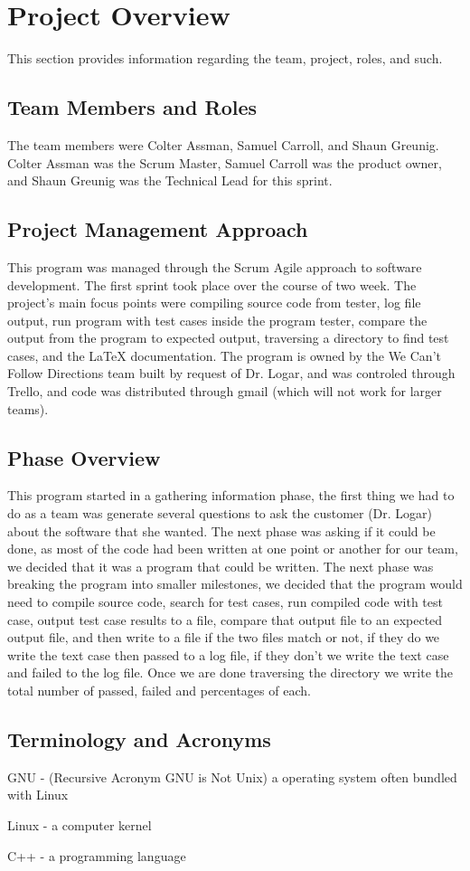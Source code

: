 

\chapter{Project Overview}
This section provides information regarding the team, project, roles, and such.



\section{Team Members and Roles}
The team members were Colter Assman, Samuel Carroll, and Shaun Greunig.   
Colter Assman was the Scrum Master, Samuel Carroll was the product owner, 
and Shaun Greunig was the Technical Lead for this sprint.


\section{Project  Management Approach}
This program was managed through the Scrum Agile approach to software development.   
The first sprint took place over the course of two week.   The project's main focus points
were compiling source code from tester, log file output, run program with test cases inside 
the program tester, compare the output from the program to expected output, traversing 
a directory to find test cases, and the LaTeX documentation.   The program is owned by the
We Can't Follow Directions team built by request of Dr. Logar, and was controled through 
Trello, and code was distributed through gmail (which will not work for larger teams).



\section{Phase  Overview}
This program started in a gathering information phase, the first thing we had to do as a team 
was generate several questions to ask the customer (Dr. Logar) about the software that she 
wanted.   The next phase was asking if it could be done, as most of the code had been written 
at one point or another for our team, we decided that it was a program that could be written.  
The next phase was breaking the program into smaller milestones, we decided that the program 
would need to compile source code, search for test cases, run compiled code with test case, 
output test case results to a file, compare that output file to an expected output file, and then 
write to a file if the two files match or not, if they do we write the text case then passed to a log 
file, if they don't we write the text case and failed to the log file.   Once we are done traversing the 
directory we write the total number of passed, failed and percentages of each.


\section{Terminology and Acronyms}
GNU - (Recursive Acronym GNU is Not Unix) a operating system often bundled with Linux

Linux - a computer kernel

C++ - a programming language
